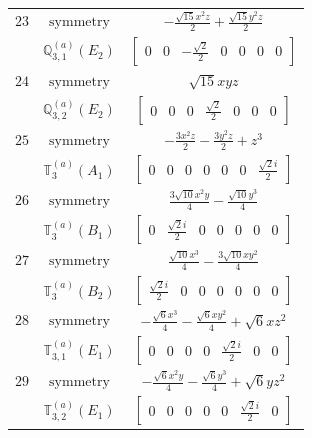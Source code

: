 \documentclass[fleqn,8pt,landscape]{jsarticle}
\begin{document}
\begin{longtable}{ccc}
$ 23 $ & $ \text{symmetry} $ & $ - \frac{\sqrt{15} x^{2} z}{2} + \frac{\sqrt{15} y^{2} z}{2} $ \\
$  $ & $ \mathbb{Q}_{3,1}^{(a)}(E_{2}) $ & $ \begin{bmatrix} 0 & 0 & - \frac{\sqrt{2}}{2} & 0 & 0 & 0 & 0 \end{bmatrix} $ \\ \hline
$ 24 $ & $ \text{symmetry} $ & $ \sqrt{15} x y z $ \\
$  $ & $ \mathbb{Q}_{3,2}^{(a)}(E_{2}) $ & $ \begin{bmatrix} 0 & 0 & 0 & \frac{\sqrt{2}}{2} & 0 & 0 & 0 \end{bmatrix} $ \\ \hline
$ 25 $ & $ \text{symmetry} $ & $ - \frac{3 x^{2} z}{2} - \frac{3 y^{2} z}{2} + z^{3} $ \\
$  $ & $ \mathbb{T}_{3}^{(a)}(A_{1}) $ & $ \begin{bmatrix} 0 & 0 & 0 & 0 & 0 & 0 & \frac{\sqrt{2} i}{2} \end{bmatrix} $ \\ \hline
$ 26 $ & $ \text{symmetry} $ & $ \frac{3 \sqrt{10} x^{2} y}{4} - \frac{\sqrt{10} y^{3}}{4} $ \\
$  $ & $ \mathbb{T}_{3}^{(a)}(B_{1}) $ & $ \begin{bmatrix} 0 & \frac{\sqrt{2} i}{2} & 0 & 0 & 0 & 0 & 0 \end{bmatrix} $ \\ \hline
$ 27 $ & $ \text{symmetry} $ & $ \frac{\sqrt{10} x^{3}}{4} - \frac{3 \sqrt{10} x y^{2}}{4} $ \\
$  $ & $ \mathbb{T}_{3}^{(a)}(B_{2}) $ & $ \begin{bmatrix} \frac{\sqrt{2} i}{2} & 0 & 0 & 0 & 0 & 0 & 0 \end{bmatrix} $ \\ \hline
$ 28 $ & $ \text{symmetry} $ & $ - \frac{\sqrt{6} x^{3}}{4} - \frac{\sqrt{6} x y^{2}}{4} + \sqrt{6} x z^{2} $ \\
$  $ & $ \mathbb{T}_{3,1}^{(a)}(E_{1}) $ & $ \begin{bmatrix} 0 & 0 & 0 & 0 & \frac{\sqrt{2} i}{2} & 0 & 0 \end{bmatrix} $ \\ \hline
$ 29 $ & $ \text{symmetry} $ & $ - \frac{\sqrt{6} x^{2} y}{4} - \frac{\sqrt{6} y^{3}}{4} + \sqrt{6} y z^{2} $ \\
$  $ & $ \mathbb{T}_{3,2}^{(a)}(E_{1}) $ & $ \begin{bmatrix} 0 & 0 & 0 & 0 & 0 & \frac{\sqrt{2} i}{2} & 0 \end{bmatrix} $ \\ \hline

\end{longtable}
\end{document}
